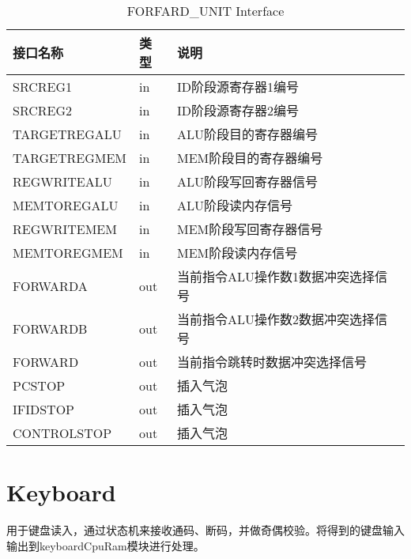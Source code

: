 \begin{center}
\renewcommand{\arraystretch}{1.3}
\small
\begin{longtable}{|p{3cm}<{\centering}|p{1.4cm}<{\centering}|p{7cm}<{\centering}|}
\caption{FORFARD\_UNIT Interface}
\label{tab:treatments}\\
\hline
接口名称 & 类型 & 说明 \\
\hline
SRCREG1 & in & ID阶段源寄存器1编号 \\
\hline
SRCREG2 & in & ID阶段源寄存器2编号 \\
\hline
TARGETREGALU & in & ALU阶段目的寄存器编号 \\
\hline
TARGETREGMEM & in & MEM阶段目的寄存器编号 \\
\hline
REGWRITEALU & in & ALU阶段写回寄存器信号 \\
\hline
MEMTOREGALU & in & ALU阶段读内存信号 \\
\hline
REGWRITEMEM & in & MEM阶段写回寄存器信号 \\
\hline
MEMTOREGMEM & in & MEM阶段读内存信号 \\
\hline
FORWARDA & out & 当前指令ALU操作数1数据冲突选择信号 \\
\hline
FORWARDB & out & 当前指令ALU操作数2数据冲突选择信号\\
\hline
FORWARD & out & 当前指令跳转时数据冲突选择信号\\
\hline
PCSTOP & out & 插入气泡\\
\hline
IFIDSTOP & out & 插入气泡\\
\hline
CONTROLSTOP & out & 插入气泡\\
\hline
\end{longtable}
\end{center}


\section{Keyboard}

用于键盘读入，通过状态机来接收通码、断码，并做奇偶校验。将得到的键盘输入输出到keyboardCpuRam模块进行处理。

